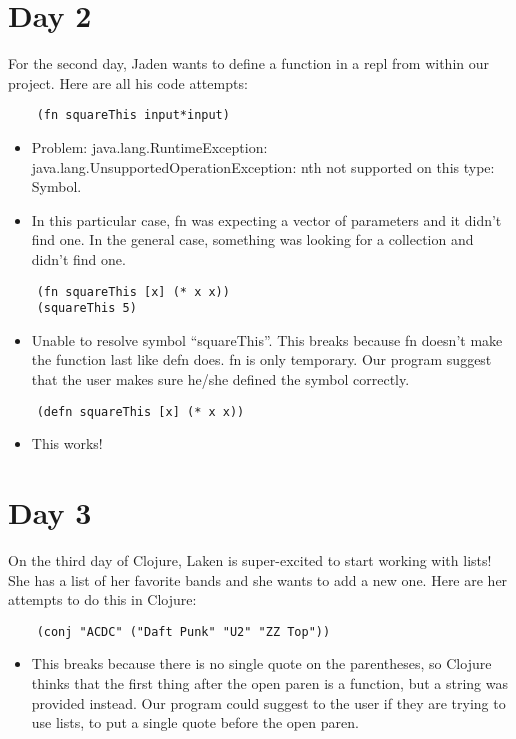 \documentclass[12pt]{article}
\begin{document}
\section{Day 2}
For the second day, Jaden wants to define a function in a repl from within our project. Here are all his code attempts:

\begin{verbatim}
	(fn squareThis input*input)
\end{verbatim}
\begin{itemize}
	\item Problem: java.lang.RuntimeException: java.lang.UnsupportedOperationException: nth not supported on this type: Symbol.
	\item In this particular case, fn was expecting a vector of parameters and it didn't find one. In the general case, something was looking for a collection and didn't find one.
\end{itemize}

\begin{verbatim}
	(fn squareThis [x] (* x x))
	(squareThis 5)
\end{verbatim}
\begin{itemize}
	\item Unable to resolve symbol “squareThis”. This breaks because fn doesn’t make the function last like defn does. fn is only temporary. Our program suggest that the user makes sure he/she defined the symbol correctly.
\end{itemize}

\begin{verbatim}
	(defn squareThis [x] (* x x))
\end{verbatim}
\begin{itemize}
	\item This works!
\end{itemize}

\section{Day 3}
On the third day of Clojure, Laken is super-excited to start working with lists! She has a list of her favorite bands and she wants to add a new one. Here are her attempts to do this in Clojure:
\begin{verbatim}
	(conj "ACDC" ("Daft Punk" "U2" "ZZ Top"))
\end{verbatim}
\begin{itemize}
	\item This breaks because there is no single quote on the parentheses, so Clojure thinks that the first thing after the open paren is a function, but a string was provided instead. Our program could suggest to the user if they are trying to use lists, to put a single quote before the open paren. 
\end{itemize}
\end{document}

